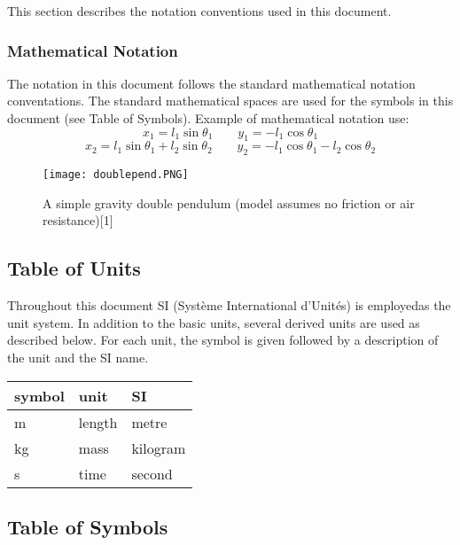 \documentclass[12pt]{article}
\begin{document}
This section describes the notation conventions used in this document.

\subsubsection{Mathematical Notation}

The notation in this document follows the standard mathematical notation
conventations.
The standard mathematical spaces are used for the symbols in this document (see
Table of Symbols).
Example of mathematical notation use:
$$x_1 = l_1 \sin\theta_1 \quad\quad y_1 = -l_1 \cos\theta_1$$
$$x_2 = l_1 \sin\theta_1 + l_2 \sin\theta_2 \quad\quad y_2 = -l_1\cos\theta_1
-l_2\cos\theta_2$$

\begin{figure}[H]
	\centering
	\texttt{[image: doublepend.PNG]}
\caption{A simple gravity double pendulum (model assumes no friction or air
resistance)[1]}
	\label{fig:maxresdefault}
\end{figure}

\subsection{Table of Units}

Throughout this document SI (Syst\`{e}me International d'Unit\'{e}s) is
employedas the unit system. In addition to the basic units, several derived
units are
used as described below.  For each unit, the symbol is given followed by a
description of the unit and the SI name.\\

\renewcommand{\arraystretch}{1.2}
\begin{center}
  \noindent \begin{tabular}{l l l} 
    \toprule		
    \textbf{symbol} & \textbf{unit} & \textbf{SI}\\
    \midrule 
    \si{\metre} & length & metre\\
    \si{\kilogram} & mass & kilogram\\
    \si{\second} & time & second\\
    \bottomrule
  \end{tabular}
\end{center}

\newpage

\subsection{Table of Symbols}
\end{document}
